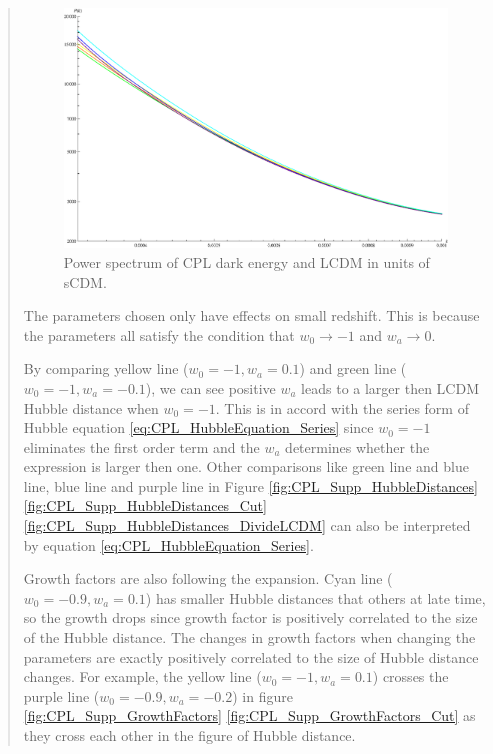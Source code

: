 \documentclass{article}
\begin{document}
\begin{quotation}
{\begin{enumerate}
\begin{figure}[!htpb]
\centering
\includegraphics[width=350pt]{CPL_Supp_PowerSpectrums_Detail.eps}
\caption{\color{blue}Power spectrum of CPL dark energy and LCDM in units of sCDM.}\label{fig:CPL_Supp_PowerSpectrums_Detail}
\end{figure}

The parameters chosen only have effects on small redshift. This is because the parameters all satisfy the condition that $w_0\rightarrow -1$ and $w_a\rightarrow 0$.

By comparing yellow line ($w_0=-1, w_a=0.1$) and green line ($w_0=-1, w_a=-0.1$), we can see positive $w_a$ leads to a larger then LCDM Hubble distance when $w_0=-1$. This is in accord with the series form of Hubble equation \ref{eq:CPL_HubbleEquation_Series} since $w_0=-1$ eliminates the first order term and the $w_a$ determines whether the expression is larger then one.
Other comparisons like green line and blue line, blue line and purple line in Figure \ref{fig:CPL_Supp_HubbleDistances} \ref{fig:CPL_Supp_HubbleDistances_Cut} \ref{fig:CPL_Supp_HubbleDistances_DivideLCDM} can also be interpreted by equation \ref{eq:CPL_HubbleEquation_Series}.


Growth factors are also following the expansion. Cyan line ($w_0=-0.9, w_a=0.1$) has smaller Hubble distances that others at late time, so the growth drops since growth factor is positively correlated to the size of the Hubble distance. The changes in growth factors when changing the parameters are exactly positively correlated to the size of Hubble distance changes. For example, the yellow line ($w_0=-1, w_a=0.1$) crosses the purple line ($w_0=-0.9, w_a=-0.2$) in figure \ref{fig:CPL_Supp_GrowthFactors} \ref{fig:CPL_Supp_GrowthFactors_Cut} as they cross each other in the figure of Hubble distance.


\end{enumerate}}
\end{quotation}
\end{document}
